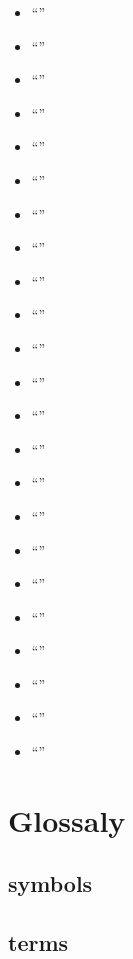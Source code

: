 \documentclass[pdflatex,sn-mathphys-num]{sn-jnl}%
\theoremstyle{thmstyleone}%
\theoremstyle{thmstyletwo}%
\theoremstyle{thmstylethree}%
\newcommand{\pname}[1]{``{\sl #1}''}
\begin{document}
\begin{enumerate}
\begin{itemize}
			\item \pname{}\cite{}
			\item \pname{}\cite{}
			\item \pname{}\cite{}
			\item \pname{}\cite{}
			\item \pname{}\cite{}
			\item \pname{}\cite{}
			\item \pname{}\cite{}
			\item \pname{}\cite{}
			\item \pname{}\cite{}
			\item \pname{}\cite{}
			\item \pname{}\cite{}
			\item \pname{}\cite{}
			\item \pname{}\cite{}
			\item \pname{}\cite{}
			\item \pname{}\cite{}
			\item \pname{}\cite{}
			\item \pname{}\cite{}
			\item \pname{}\cite{}
			\item \pname{}\cite{}
			\item \pname{}\cite{}
			\item \pname{}\cite{}
			\item \pname{}\cite{}
			\item \pname{}\cite{}
		\end{itemize}
	
\end{enumerate}


\section{Glossaly}\label{ap1}
\subsection{symbols}

\subsection{terms}
\printglossaries

\appendix

\end{document}
